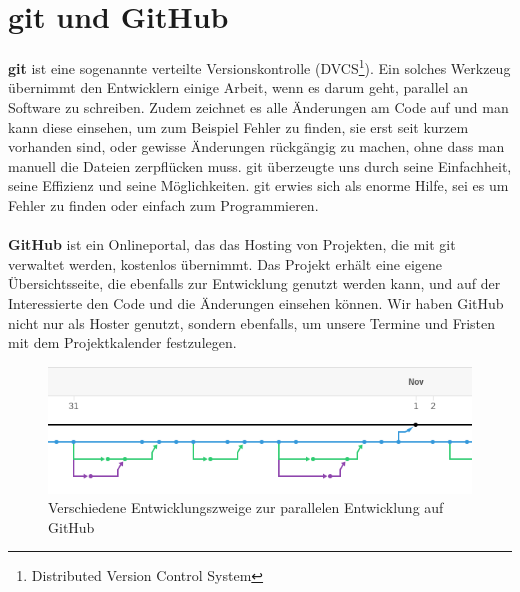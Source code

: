 \documentclass[11pt,a4paper]{scrbook}
\begin{document}
\section{git und GitHub}
\textbf{git} ist eine sogenannte verteilte Versionskontrolle (DVCS\footnote{Distributed Version Control System}). Ein solches Werkzeug übernimmt
den Entwicklern einige Arbeit, wenn es darum geht, parallel an Software zu schreiben. Zudem zeichnet es alle Änderungen am Code auf und man kann diese
einsehen, um zum Beispiel Fehler zu finden, sie erst seit kurzem vorhanden sind, oder gewisse Änderungen rückgängig zu machen, ohne dass man
manuell die Dateien zerpflücken muss. git überzeugte uns durch seine Einfachheit, seine Effizienz und seine Möglichkeiten. git erwies sich
als enorme Hilfe, sei es um Fehler zu finden oder einfach zum Programmieren.
\\
\\
\textbf{GitHub} ist ein
Onlineportal, das das Hosting von Projekten, die mit git verwaltet werden, kostenlos übernimmt. Das Projekt erhält eine eigene Übersichtsseite,
die ebenfalls zur Entwicklung genutzt werden kann, und auf der Interessierte den Code und die Änderungen einsehen können. Wir haben GitHub nicht nur
als Hoster genutzt, sondern ebenfalls, um unsere Termine und Fristen mit dem Projektkalender festzulegen.
\begin{figure}
\centering
\includegraphics[scale=1]{img/branches.png}
\caption{Verschiedene Entwicklungszweige zur parallelen Entwicklung auf GitHub}
\label{fig:branches}
\end{figure}
\end{document}
